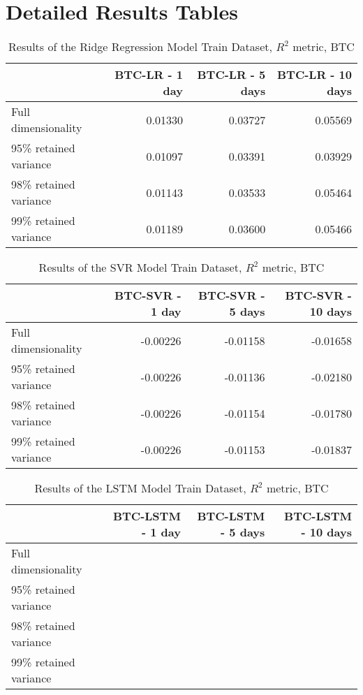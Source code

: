 \chapter{Detailed Results Tables}
\label{app:A}
\begin{table}[htbp]
\centering
\caption{Results of the Ridge Regression Model Train Dataset, $R^2$ metric, BTC}
\begin{tabular}{lrrr}
    \toprule
    {} &  BTC-LR - 1 day &  BTC-LR - 5 days &  BTC-LR - 10 days \\
    \midrule
    Full dimensionality   &         0.01330 &          0.03727 &           0.05569 \\
    95\% retained variance &         0.01097 &          0.03391 &           0.03929 \\
    98\% retained variance &         0.01143 &          0.03533 &           0.05464 \\
    99\% retained variance &         0.01189 &          0.03600 &           0.05466 \\
    \bottomrule
\end{tabular}
\end{table}


\begin{table}[htbp]
    \centering
    \caption{Results of the SVR Model Train Dataset, $R^2$ metric, BTC}
\begin{tabular}{lrrr}
    \toprule
    {} &  BTC-SVR - 1 day &  BTC-SVR - 5 days &  BTC-SVR - 10 days \\
    \midrule
    Full dimensionality   &      -0.00226 &          -0.01158 &           -0.01658 \\
    95\% retained variance &      -0.00226 &          -0.01136 &           -0.02180 \\
    98\% retained variance &      -0.00226 &          -0.01154 &           -0.01780 \\
    99\% retained variance &      -0.00226 &          -0.01153 &           -0.01837 \\
    \bottomrule
\end{tabular}
\end{table}

\begin{table}[htbp]
    \centering
    \caption{Results of the LSTM Model Train Dataset, $R^2$ metric, BTC}
\begin{tabular}{lrrr}
    \toprule
    {} &  BTC-LSTM - 1 day &  BTC-LSTM - 5 days &  BTC-LSTM - 10 days \\
    \midrule
    Full dimensionality   &       &           &           \\
    95\% retained variance &       &           &            \\
    98\% retained variance &       &          &            \\
    99\% retained variance &      &       &           \\
    \bottomrule
\end{tabular}
\end{table}

